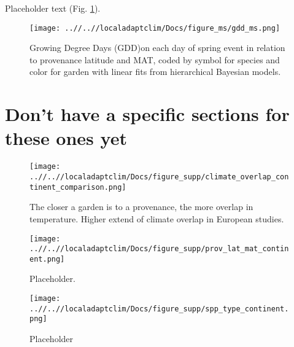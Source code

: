 \documentclass{article}
\begin{document}
Placeholder text (Fig. \ref{figure:gdd}).

\begin{figure}[!h] 
    \centering
 \texttt{[image: ..//..//localadaptclim/Docs/figure\_ms/gdd\_ms.png]}
    \caption{Growing Degree Days (GDD)on each day of spring event in relation to provenance latitude and MAT, coded by symbol for species and color for garden with linear fits from hierarchical Bayesian models.}
    \label{figure:gdd}
\end{figure}


\section {Don't have a specific sections for these ones yet}

\begin{figure}[!h] 
    \centering
 \texttt{[image: ..//..//localadaptclim/Docs/figure\_supp/climate\_overlap\_continent\_comparison.png]}
    \caption{The closer a garden is to a provenance, the more overlap in temperature. 
Higher extend of climate overlap in European studies.}
    \label{figure:overlap_continent}
\end{figure}

\begin{figure}[!h] 
    \centering
 \texttt{[image: ..//..//localadaptclim/Docs/figure\_supp/prov\_lat\_mat\_continent.png]}
    \caption{Placeholder.}
    \label{figure:lat_mat_continent}
\end{figure}


\begin{figure}[!h] 
    \centering
 \texttt{[image: ..//..//localadaptclim/Docs/figure\_supp/spp\_type\_continent.png]}
    \caption{Placeholder}
    \label{figure:spp_continent}
\end{figure}
\end{document}

